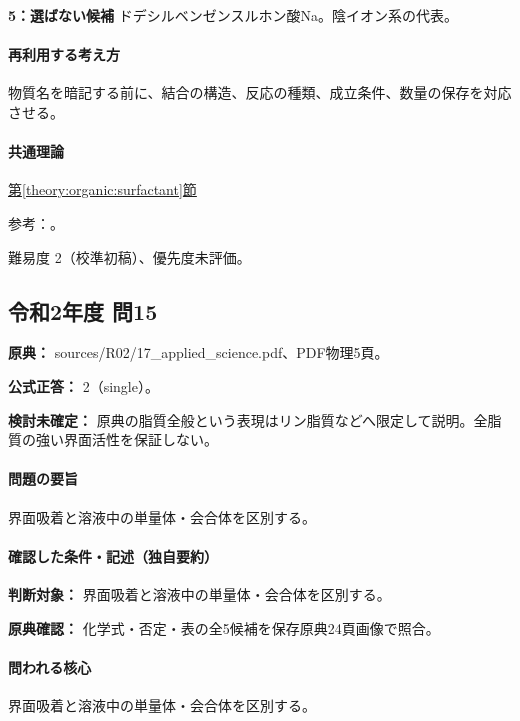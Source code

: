 \noindent\textbf{5：選ばない候補} ドデシルベンゼンスルホン酸Na。陰イオン系の代表。\par

\paragraph{再利用する考え方} 物質名を暗記する前に、結合の構造、反応の種類、成立条件、数量の保存を対応させる。

\paragraph{共通理論} \hyperref[theory:organic:surfactant]{第\ref*{theory:organic:surfactant}節}

\par 参考：\cite{organic_cmc}。

\par 難易度 2（校準初稿）、優先度未評価。

\subsection{令和2年度 問15}
\label{q:r02-reg-applied-15}

\noindent\textbf{原典：} sources/R02/17\_applied\_science.pdf、PDF物理5頁。

\textbf{公式正答：} 2（single）。

\par\textbf{検討未確定：} 原典の脂質全般という表現はリン脂質などへ限定して説明。全脂質の強い界面活性を保証しない。

\paragraph{問題の要旨} 界面吸着と溶液中の単量体・会合体を区別する。

\paragraph{確認した条件・記述（独自要約）}\mbox{}\par

\noindent\textbf{判断対象：} 界面吸着と溶液中の単量体・会合体を区別する。\par

\noindent\textbf{原典確認：} 化学式・否定・表の全5候補を保存原典24頁画像で照合。\par

\paragraph{問われる核心} 界面吸着と溶液中の単量体・会合体を区別する。

